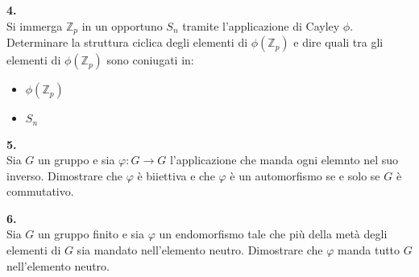 \documentclass[italian,a4paper,11pt]
{article}
\newcommand{\Z}{\mathbb Z}
\newcommand{\acc}{\`}
\begin{document}
\vspace{0.4 cm}
\noindent
\begin{Ex}\textbf{ 4.}\\
Si immerga $\Z_p$ in un opportuno $S_n$ tramite l'applicazione di Cayley $\phi$. Determinare la struttura ciclica degli elementi di $\phi(\Z_p)$ e dire quali tra gli elementi di $\phi(\Z_p)$ sono coniugati in:
\begin{itemize}
\item $\phi(\Z_p)$
\item $S_n$
\end{itemize}
\end{Ex}

\vspace{0.4 cm}
\noindent
\begin{Ex}\textbf{ 5.}\\
Sia $G$ un gruppo e sia $\varphi: G\longrightarrow G$ l'applicazione che manda ogni elemnto nel suo inverso. Dimostrare che $\varphi$ \acc e biiettiva e che $\varphi$ \acc e un automorfismo se e solo se $G$ \acc e commutativo.
\end{Ex}

\vspace{0.4 cm}
\noindent
\begin{Ex}\textbf{ 6.}\\
Sia $G$ un gruppo finito e sia $\varphi$ un endomorfismo tale che pi\acc u della met\acc a degli elementi di $G$ sia mandato nell'elemento neutro. Dimostrare che $\varphi$ manda tutto $G$ nell'elemento neutro.
\end{Ex}
\end{document}
